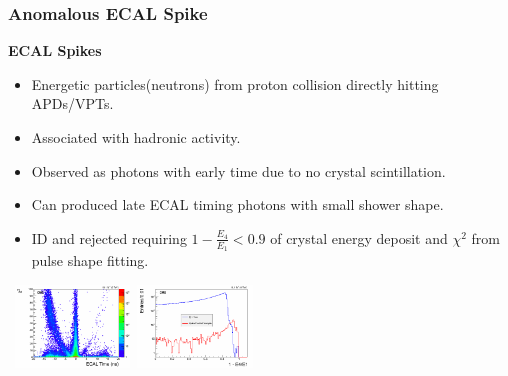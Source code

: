 \documentclass{beamer}
\begin{document}
\begin{frame}
\frametitle{Anomalous ECAL Spike}
 \small{
 \begin{varblock}[7cm]{\textbf{ECAL Spikes}}
 \begin{itemize}
  \item Energetic particles(neutrons) from proton collision directly hitting APDs/VPTs.
  \item Associated with hadronic activity.
  \item Observed as photons with early time due to no crystal scintillation.
  \item Can produced late ECAL timing photons with small shower shape.
  \item ID and rejected requiring $1 - \frac{E_{4}}{E_{1}} < 0.9$ of crystal energy deposit and $\chi^{2}$ from pulse shape fitting.
 \end{itemize}
 \end{varblock}
 }
 \vspace{-0.2cm}
 \begin{tcolorbox}[colback=UNL@Cream!5,colframe=UMN@Maroon!40,title=\textcolor{black}{\textbf{Spike Identification and Rejection}}]
 \mbox{ 
 \includegraphics[height=2.20cm,width=0.3\paperwidth]{THESISPLOTS/seedTime_Chi2.png} \quad \quad
 \includegraphics[height=2.20cm,width=0.3\paperwidth]{THESISPLOTS/swissX.png}
 } 
 \end{tcolorbox}
\end{frame}
\end{document}
